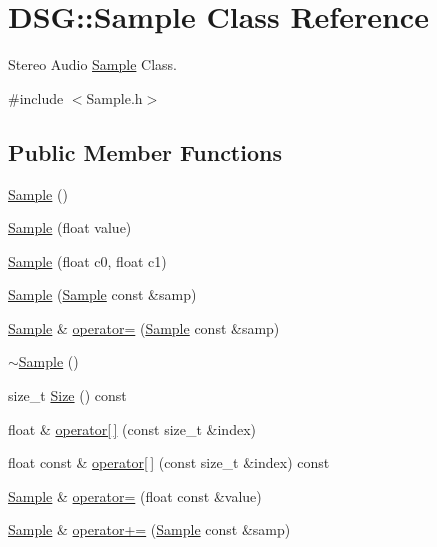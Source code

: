 \hypertarget{classDSG_1_1Sample}{\section{D\+S\+G\+:\+:Sample Class Reference}
\label{classDSG_1_1Sample}
}


Stereo Audio \hyperlink{classDSG_1_1Sample}{Sample} Class.  




{\ttfamily \#include $<$Sample.\+h$>$}

\subsection*{Public Member Functions}
\begin{DoxyCompactItemize}
\item 
\hyperlink{classDSG_1_1Sample_aaf2e30d73911eccea99b53eeee15b612}{Sample} ()
\item 
\hyperlink{classDSG_1_1Sample_a9b5f59392d91826ceceec0481f677264}{Sample} (float value)
\item 
\hyperlink{classDSG_1_1Sample_a97befdd6c269432bbba374cdb51e3241}{Sample} (float c0, float c1)
\item 
\hyperlink{classDSG_1_1Sample_a4d5a42f2264c88291e49df89588dee50}{Sample} (\hyperlink{classDSG_1_1Sample}{Sample} const \&samp)
\item 
\hyperlink{classDSG_1_1Sample}{Sample} \& \hyperlink{classDSG_1_1Sample_a55248a848f30a533d51e6d0da2d4a3e2}{operator=} (\hyperlink{classDSG_1_1Sample}{Sample} const \&samp)
\item 
\hyperlink{classDSG_1_1Sample_af5a24cf30417259e03b5176cd2aadd0c}{$\sim$\+Sample} ()
\item 
size\+\_\+t \hyperlink{classDSG_1_1Sample_abcbdcc67584e4018b24eac650724eb18}{Size} () const 
\item 
float \& \hyperlink{classDSG_1_1Sample_ac0f49c86a2b59e15ba761ec308560828}{operator\mbox{[}$\,$\mbox{]}} (const size\+\_\+t \&index)
\item 
float const \& \hyperlink{classDSG_1_1Sample_a5908819bba1cd5110593ad3f66154b53}{operator\mbox{[}$\,$\mbox{]}} (const size\+\_\+t \&index) const 
\item 
\hyperlink{classDSG_1_1Sample}{Sample} \& \hyperlink{classDSG_1_1Sample_a8eb7f791c233ade5218bc4186e390c2e}{operator=} (float const \&value)
\item 
\hyperlink{classDSG_1_1Sample}{Sample} \& \hyperlink{classDSG_1_1Sample_a608fc9b6936c9695e35c39b33623f0d9}{operator+=} (\hyperlink{classDSG_1_1Sample}{Sample} const \&samp)

\end{DoxyCompactItemize}
